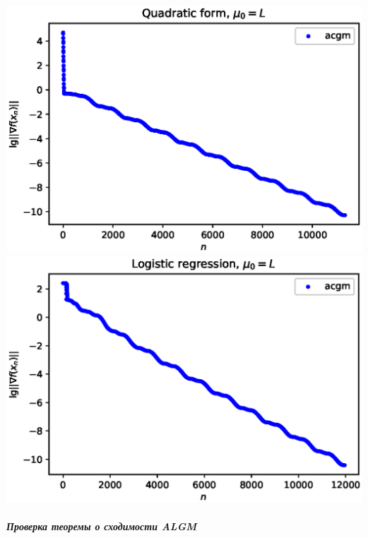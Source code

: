 \documentclass{crm-article}
\begin{document}
\noindent
\includegraphics[scale=0.5]{plots/ogmg_acgm3.eps}
\includegraphics[scale=0.5]{plots/ogmg_acgm4.eps}

\subparagraph{Проверка теоремы о сходимости ALGM}
\end{document}
